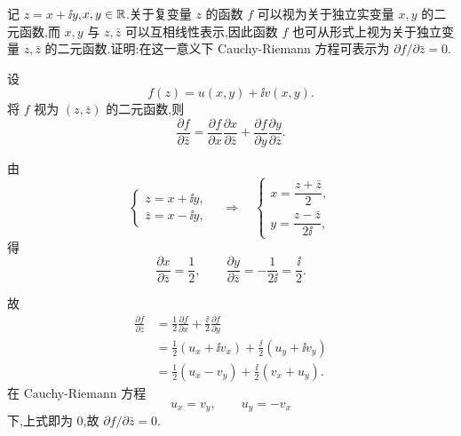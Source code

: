 \begin{problem}
记 $z=x+\ii y$,$x,y\in\mathbb{R}$.关于复变量 $z$ 的函数 $f$ 可以视为关于独立实变量 $x,y$ 的二元函数,而 $x,y$ 与 $z,\bar z$ 可以互相线性表示,因此函数 $f$ 也可从形式上视为关于独立变量 $z,\bar z$ 的二元函数.证明:在这一意义下 Cauchy-Riemann 方程可表示为
\(
\partial f / \partial \bar{z} =0.
\)
\begin{solution}
设
\[
f(z)=u(x,y)+\ii v(x,y).
\]
将 $f$ 视为 $(z,\bar z)$ 的二元函数,则
\[
\frac{\partial f}{\partial\bar z}
=\frac{\partial f}{\partial x}\frac{\partial x}{\partial\bar z}
+\frac{\partial f}{\partial y}\frac{\partial y}{\partial\bar z}.
\]

由
\[
\begin{cases}
z=x+\ii y,\\
\bar z=x-\ii y,
\end{cases}
\quad\Longrightarrow\quad
\begin{cases}
x=\dfrac{z+\bar z}{2},\\[2mm]
y=\dfrac{z-\bar z}{2\ii},
\end{cases}
\]
得
\[
\frac{\partial x}{\partial\bar z}=\frac12,\qquad
\frac{\partial y}{\partial\bar z}=-\frac1{2\ii}=\frac{\ii}{2}.
\]

故
\begin{align*}
\frac{\partial f}{\partial\bar z}
&=\frac12\frac{\partial f}{\partial x}
+\frac{\ii}{2}\frac{\partial f}{\partial y}\\
&=\frac12(u_x+\ii v_x)+\frac{\ii}{2}(u_y+\ii v_y)\\
&=\frac12(u_x-v_y)+\frac{\ii}{2}(v_x+u_y).
\end{align*}
在 Cauchy-Riemann 方程
\[
u_x=v_y,\qquad u_y=-v_x
\]
下,上式即为 $0$,故 $\partial f/\partial\bar z=0$.
\end{solution}
\end{problem}

